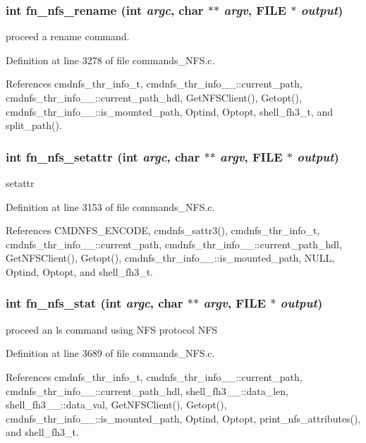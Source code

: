 \subsubsection{\setlength{\rightskip}{0pt plus 5cm}int fn\_\-nfs\_\-rename (int {\em argc}, char $\ast$$\ast$ {\em argv}, FILE $\ast$ {\em output})}\label{commands__NFS_8c_a50}


proceed a rename command. 

Definition at line 3278 of file commands\_\-NFS.c.

References cmdnfs\_\-thr\_\-info\_\-t, cmdnfs\_\-thr\_\-info\_\-\_\-::current\_\-path, cmdnfs\_\-thr\_\-info\_\-\_\-::current\_\-path\_\-hdl, Get\-NFSClient(), Getopt(), cmdnfs\_\-thr\_\-info\_\-\_\-::is\_\-mounted\_\-path, Optind, Optopt, shell\_\-fh3\_\-t, and split\_\-path().
\subsubsection{\setlength{\rightskip}{0pt plus 5cm}int fn\_\-nfs\_\-setattr (int {\em argc}, char $\ast$$\ast$ {\em argv}, FILE $\ast$ {\em output})}\label{commands__NFS_8c_a49}


setattr 

Definition at line 3153 of file commands\_\-NFS.c.

References CMDNFS\_\-ENCODE, cmdnfs\_\-sattr3(), cmdnfs\_\-thr\_\-info\_\-t, cmdnfs\_\-thr\_\-info\_\-\_\-::current\_\-path, cmdnfs\_\-thr\_\-info\_\-\_\-::current\_\-path\_\-hdl, Get\-NFSClient(), Getopt(), cmdnfs\_\-thr\_\-info\_\-\_\-::is\_\-mounted\_\-path, NULL, Optind, Optopt, and shell\_\-fh3\_\-t.
\subsubsection{\setlength{\rightskip}{0pt plus 5cm}int fn\_\-nfs\_\-stat (int {\em argc}, char $\ast$$\ast$ {\em argv}, FILE $\ast$ {\em output})}\label{commands__NFS_8c_a53}


proceed an ls command using NFS protocol NFS 

Definition at line 3689 of file commands\_\-NFS.c.

References cmdnfs\_\-thr\_\-info\_\-t, cmdnfs\_\-thr\_\-info\_\-\_\-::current\_\-path, cmdnfs\_\-thr\_\-info\_\-\_\-::current\_\-path\_\-hdl, shell\_\-fh3\_\-\_\-::data\_\-len, shell\_\-fh3\_\-\_\-::data\_\-val, Get\-NFSClient(), Getopt(), cmdnfs\_\-thr\_\-info\_\-\_\-::is\_\-mounted\_\-path, Optind, Optopt, print\_\-nfs\_\-attributes(), and shell\_\-fh3\_\-t.
